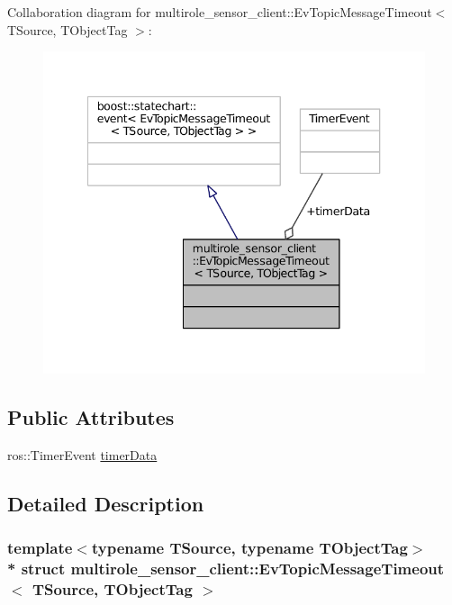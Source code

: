 Collaboration diagram for multirole\+\_\+sensor\+\_\+client\+:\+:Ev\+Topic\+Message\+Timeout$<$ T\+Source, T\+Object\+Tag $>$\+:
\nopagebreak
\begin{figure}[H]
\begin{center}
\leavevmode
\includegraphics[width=340pt]{structmultirole__sensor__client_1_1EvTopicMessageTimeout__coll__graph}
\end{center}
\end{figure}
\subsection*{Public Attributes}
\begin{DoxyCompactItemize}
\item 
ros\+::\+Timer\+Event \hyperlink{structmultirole__sensor__client_1_1EvTopicMessageTimeout_acf6851104497bd60ac389051f5b4f2b0}{timer\+Data}
\end{DoxyCompactItemize}


\subsection{Detailed Description}
\subsubsection*{template$<$typename T\+Source, typename T\+Object\+Tag$>$\\*
struct multirole\+\_\+sensor\+\_\+client\+::\+Ev\+Topic\+Message\+Timeout$<$ T\+Source, T\+Object\+Tag $>$}



